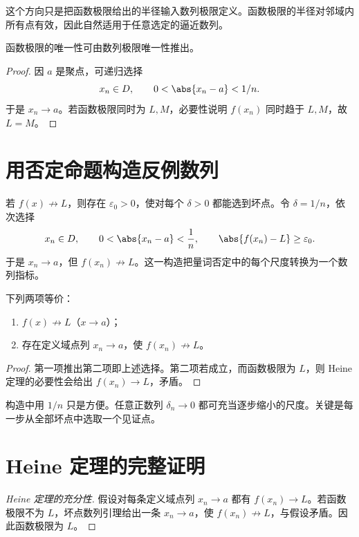 这个方向只是把函数极限给出的半径输入数列极限定义。函数极限的半径对邻域内所有点有效，因此自然适用于任意选定的逼近数列。

\begin{corollary}
函数极限的唯一性可由数列极限唯一性推出。
\end{corollary}

\begin{proof}
因 \(a\) 是聚点，可递归选择
\[
 x_n\in D,\qquad0<\abs{x_n-a}<1/n.
\]
于是 \(x_n\to a\)。若函数极限同时为 \(L,M\)，必要性说明 \(f(x_n)\) 同时趋于 \(L,M\)，故 \(L=M\)。
\end{proof}

\section{用否定命题构造反例数列}

若 \(f(x)\not\to L\)，则存在 \(\varepsilon_0>0\)，使对每个 \(\delta>0\) 都能选到坏点。令 \(\delta=1/n\)，依次选择
\[
 x_n\in D,\qquad
 0<\abs{x_n-a}<\frac1n,\qquad
 \abs{f(x_n)-L}\ge\varepsilon_0.
\]
于是 \(x_n\to a\)，但 \(f(x_n)\not\to L\)。这一构造把量词否定中的每个尺度转换为一个数列指标。

\begin{lemma}[坏点数列]
下列两项等价：
\begin{enumerate}
 \item \(f(x)\not\to L\)（\(x\to a\)）；
 \item 存在定义域点列 \(x_n\to a\)，使 \(f(x_n)\not\to L\)。
\end{enumerate}
\end{lemma}

\begin{proof}
第一项推出第二项即上述选择。第二项若成立，而函数极限为 \(L\)，则 Heine 定理的必要性会给出 \(f(x_n)\to L\)，矛盾。
\end{proof}

\begin{remark}
构造中用 \(1/n\) 只是方便。任意正数列 \(\delta_n\to0\) 都可充当逐步缩小的尺度。关键是每一步从全部坏点中选取一个见证点。
\end{remark}

\section{Heine 定理的完整证明}

\begin{proof}[Heine 定理的充分性]
假设对每条定义域点列 \(x_n\to a\) 都有 \(f(x_n)\to L\)。若函数极限不为 \(L\)，坏点数列引理给出一条 \(x_n\to a\)，使 \(f(x_n)\not\to L\)，与假设矛盾。因此函数极限为 \(L\)。
\end{proof}

